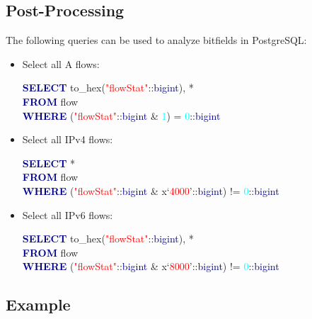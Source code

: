 \documentclass[documentation]{subfiles}
\begin{document}
\subsection{Post-Processing}
The following queries can be used to analyze bitfields in PostgreSQL:
\begin{itemize}
    \item Select all A flows:\\
        \begin{ttfamily}
            \textcolor{darkblue}{\bf SELECT} to\_hex(\textcolor{red}{"flowStat"}::\textcolor{darkblue}{bigint}), *\\
            \textcolor{darkblue}{\bf FROM} flow\\
            \textcolor{darkblue}{\bf WHERE} (\textcolor{red}{"flowStat"}::\textcolor{darkblue}{bigint} \& \textcolor{cyan}{1}) = \textcolor{cyan}{0}::\textcolor{darkblue}{bigint}
        \end{ttfamily}
    \item Select all IPv4 flows:\\
        \begin{ttfamily}
            \textcolor{darkblue}{\bf SELECT} *\\
            \textcolor{darkblue}{\bf FROM} flow\\
            \textcolor{darkblue}{\bf WHERE} (\textcolor{red}{"flowStat"}::\textcolor{darkblue}{bigint} \& x`\textcolor{red}{4000}'::\textcolor{darkblue}{bigint}) != \textcolor{cyan}{0}::\textcolor{darkblue}{bigint}
        \end{ttfamily}
    \item Select all IPv6 flows:\\
        \begin{ttfamily}
            \textcolor{darkblue}{\bf SELECT} to\_hex(\textcolor{red}{"flowStat"}::\textcolor{darkblue}{bigint}), *\\
            \textcolor{darkblue}{\bf FROM} flow\\
            \textcolor{darkblue}{\bf WHERE} (\textcolor{red}{"flowStat"}::\textcolor{darkblue}{bigint} \& x`\textcolor{red}{8000}'::\textcolor{darkblue}{bigint}) != \textcolor{cyan}{0}::\textcolor{darkblue}{bigint}
        \end{ttfamily}
\end{itemize}

\subsection{Example}
\end{document}
